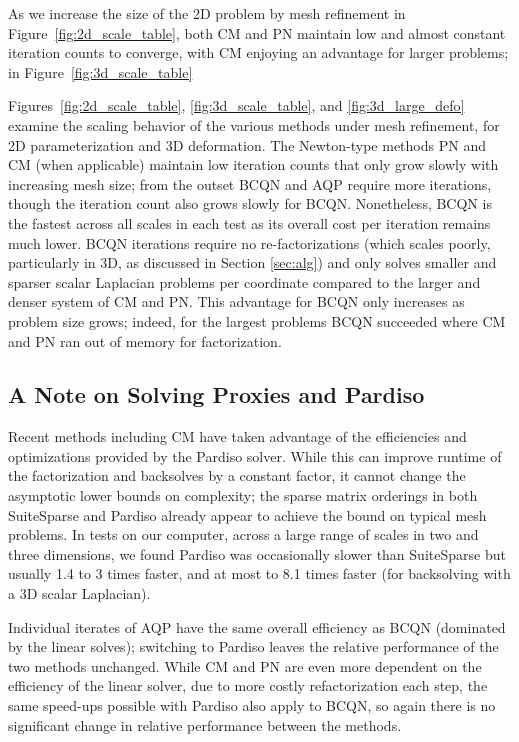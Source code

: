 As we increase the size of the 2D problem by mesh refinement in
Figure~\ref{fig:2d_scale_table}, both CM and PN maintain low and almost constant
iteration counts to converge, with CM enjoying an advantage for larger problems;
in Figure~\ref{fig:3d_scale_table} 

Figures~\ref{fig:2d_scale_table}, \ref{fig:3d_scale_table}, and
\ref{fig:3d_large_defo} examine the scaling behavior of the various
methods under mesh refinement, for 2D parameterization and 3D deformation.
The Newton-type methods PN and CM (when applicable) maintain low
iteration counts that only grow slowly with increasing mesh size;
from the outset BCQN and AQP require more iterations, though the iteration count
also grows slowly for BCQN. Nonetheless, BCQN is the fastest across
all scales in each test as its overall cost per iteration remains much lower.
BCQN iterations require no re-factorizations (which scales poorly, particularly
in 3D, as discussed in Section \ref{sec:alg}) and only solves
smaller and sparser scalar Laplacian problems per coordinate compared
to the larger and denser system of CM and PN. This advantage for BCQN only
increases as problem size grows; indeed, for the largest problems BCQN
succeeded where CM and PN ran out of memory for factorization.

\subsection{A Note on Solving Proxies and Pardiso} 
\label{sec:pardiso}

Recent methods including CM have taken advantage of the efficiencies
and optimizations provided by the Pardiso solver.
While this can improve runtime of the factorization and backsolves
by a constant factor, it cannot change the asymptotic lower bounds on complexity;
the sparse matrix orderings in both SuiteSparse and Pardiso already appear
to achieve the bound on typical mesh problems.
In tests on our computer, across a large range of scales in two and
three dimensions, we found Pardiso was occasionally slower than
SuiteSparse but usually 1.4 to 3 times faster, and at most to 8.1 times faster
(for backsolving with a 3D scalar Laplacian).

Individual iterates of AQP have the same overall efficiency as BCQN (dominated
by the linear solves); switching to Pardiso leaves the relative performance of the two methods
unchanged. While CM and PN are even more dependent on the efficiency of the linear solver,
due to more costly refactorization each step, the same speed-ups possible with Pardiso also apply to
BCQN, so again there is no significant change in relative performance between the
methods.


